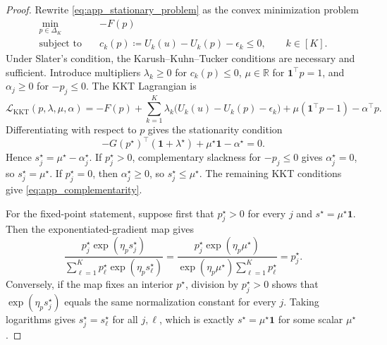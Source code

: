 \begin{proof}
Rewrite \eqref{eq:app_stationary_problem} as the convex minimization problem
\begin{equation}
\begin{aligned}
    \min_{p\in\Delta_K}\quad
    &-F(p)\\
    \text{subject to}\quad
    &c_k(p)\coloneqq U_k(u)-U_k(p)-\epsilon_k\le0,
    \qquad k\in[K].
\end{aligned}
\end{equation}
Under Slater's condition, the Karush--Kuhn--Tucker conditions are necessary and sufficient. Introduce multipliers $\lambda_k\ge0$ for $c_k(p)\le0$, $\mu\in\mathbb{R}$ for $\mathbf{1}^\top p=1$, and $\alpha_j\ge0$ for $-p_j\le0$. The KKT Lagrangian is
\begin{equation}
    \mathcal{L}_{\mathrm{KKT}}(p,\lambda,\mu,\alpha)
    =
    -F(p)
    +\sum_{k=1}^K\lambda_k\bigl(U_k(u)-U_k(p)-\epsilon_k\bigr)
    +\mu(\mathbf{1}^\top p-1)
    -\alpha^\top p.
\end{equation}
Differentiating with respect to $p$ gives the stationarity condition
\begin{equation}
    -G(p^\star)^\top(\mathbf{1}+\lambda^\star)
    +\mu^\star\mathbf{1}
    -\alpha^\star
    =0.
    \label{eq:app_KKT_stationarity}
\end{equation}
Hence $s_j^\star=\mu^\star-\alpha_j^\star$. If $p_j^\star>0$, complementary slackness for $-p_j\le0$ gives $\alpha_j^\star=0$, so $s_j^\star=\mu^\star$. If $p_j^\star=0$, then $\alpha_j^\star\ge0$, so $s_j^\star\le\mu^\star$. The remaining KKT conditions give \eqref{eq:app_complementarity}.

For the fixed-point statement, suppose first that $p_j^\star>0$ for every $j$ and $s^\star=\mu^\star\mathbf{1}$. Then the exponentiated-gradient map gives
\begin{equation}
    \frac{
        p_j^\star\exp(\eta_p s_j^\star)
    }{
        \sum_{\ell=1}^K p_\ell^\star\exp(\eta_p s_\ell^\star)
    }
    =
    \frac{
        p_j^\star\exp(\eta_p\mu^\star)
    }{
        \exp(\eta_p\mu^\star)\sum_{\ell=1}^K p_\ell^\star
    }
    =p_j^\star.
\end{equation}
Conversely, if the map fixes an interior $p^\star$, division by $p_j^\star>0$ shows that $\exp(\eta_p s_j^\star)$ equals the same normalization constant for every $j$. Taking logarithms gives $s_j^\star=s_\ell^\star$ for all $j,\ell$, which is exactly $s^\star=\mu^\star\mathbf{1}$ for some scalar $\mu^\star$.
\end{proof}

